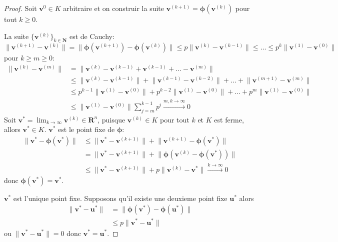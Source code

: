 \begin{proof}
Soit $\boldsymbol{v}^{0}\in K$ arbitraire et on construir la suite $\boldsymbol{v}^{(k+1)}=\boldsymbol{\phi}(\boldsymbol{v}^{(k)})$ pour tout $k\ge 0$.

La suite $\{ \boldsymbol{v}^{(k)} \}_{k\in \mathbf{N}}$ est de Cauchy:
$$
\lVert \boldsymbol{v}^{(k+1)}-\boldsymbol{v}^{(k)} \rVert =\lVert \boldsymbol{\phi}(\boldsymbol{v}^{(k+1)})-\boldsymbol{\phi}(\boldsymbol{v}^{(k)}) \rVert \le p\lVert \boldsymbol{v}^{(k)}-\boldsymbol{v}^{(k-1)} \rVert \le \dots \le p^{k}\lVert \boldsymbol{v}^{(1)}-\boldsymbol{v}^{(0)} \rVert 
$$
pour $k \ge m \ge 0$:
\begin{align*}
\lVert \boldsymbol{v}^{(k)}-\boldsymbol{v}^{(m)} \rVert  & =\lVert \boldsymbol{v}^{(k)}-\boldsymbol{v}^{(k-1)}+\boldsymbol{v}^{(k-1)}+\dots -\boldsymbol{v}^{(m)} \rVert \\
 &  \le \lVert \boldsymbol{v}^{(k)}-\boldsymbol{v}^{(k-1)} \rVert +\lVert \boldsymbol{v}^{(k-1)}-\boldsymbol{v}^{(k-2)} \rVert +\dots +\lVert \boldsymbol{v}^{(m+1)}-\boldsymbol{v}^{(m)} \rVert  \\
 & \le p^{k-1}\lVert \boldsymbol{v}^{(1)}-\boldsymbol{v}^{(0)}  \rVert +p^{k-2}\lVert \boldsymbol{v}^{(1)}-\boldsymbol{v}^{(0)} \rVert +\dots +p^{m}\lVert \boldsymbol{v}^{(1)}-\boldsymbol{v} ^{(0)}  \rVert \\
 &  \le \lVert \boldsymbol{v}^{(1)}-\boldsymbol{v}^{(0)}  \rVert \sum _{j=m}^{k-1}p^{i} \overset{m,k\to \infty }\longrightarrow 0
\end{align*}
Soit $\boldsymbol{v}^{*}=\lim_{ k \to \infty }\boldsymbol{v}^{(k)}\in \mathbf{R}^{n}$, puisque $\boldsymbol{v}^{(k)}\in K$ pour tout $k$ et $K$ est ferme, allors $\boldsymbol{v}^{*}\in K$. $\boldsymbol{v}^{*}$ est le point fixe de $\boldsymbol{\phi}$:
\begin{align*}
\lVert \boldsymbol{v}^{*}-\boldsymbol{\phi}(\boldsymbol{v}^{*}) \rVert  & \le \lVert \boldsymbol{v}^{*}-\boldsymbol{v}^{(k+1)} \rVert +\lVert \boldsymbol{v}^{(k+1)}-\boldsymbol{\phi}(\boldsymbol{v}^{*})  \rVert \\
 & = \lVert \boldsymbol{v}^{*}-\boldsymbol{v}^{(k+1)} \rVert+\lVert \boldsymbol{\phi}(\boldsymbol{v}^{(k)}-\boldsymbol{\phi}(\boldsymbol{v}^{*}) ) \rVert \\
 & \le \lVert \boldsymbol{v}^{*}-\boldsymbol{v}^{(k+1)} \rVert +p\lVert \boldsymbol{v}^{(k)}-\boldsymbol{v}^{*}  \rVert \overset{k\to \infty}\to 0    
\end{align*}
donc $\boldsymbol{\phi}(\boldsymbol{v}^{*})=\boldsymbol{v}^{*}$.

$\boldsymbol{v}^{*}$ est l'unique point fixe. Supposons qu'il existe une deuxieme point fixe $\boldsymbol{u}^{*}$ alors
\begin{align*}
\lVert \boldsymbol{v}^{*}-\boldsymbol{u}^{*} \rVert   & =\lVert \boldsymbol{\phi}(\boldsymbol{v}^{*})-\boldsymbol{\phi}(\boldsymbol{u}^{*}) \rVert \\
 & \le p\lVert \boldsymbol{v}^{*}-\boldsymbol{u}^{*} \rVert  
\end{align*}
ou $\lVert \boldsymbol{v}^{*}-\boldsymbol{u}^{*} \rVert=0$ donc $\boldsymbol{v}^{*}=\boldsymbol{u}^{*}$.
\end{proof}

